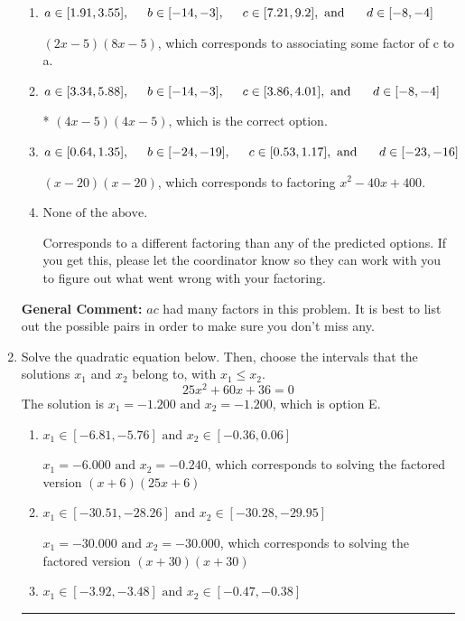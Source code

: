 \documentclass{extbook}[14pt]
\newcommand{\litem}[1]{\item #1

\rule{\textwidth}{0.4pt}}
\begin{document}
\begin{enumerate}
{\begin{enumerate}[label=\Alph*.]
 $(8x -5)(2x -5)$, which corresponds to associating some factor of a to c.
\item \( a \in [1.91, 3.55], \hspace*{5mm} b \in [-14, -3], \hspace*{5mm} c \in [7.21, 9.2], \text{ and } \hspace*{5mm} d \in [-8, -4] \)

 $(2x -5)(8x -5)$, which corresponds to associating some factor of c to a.
\item \( a \in [3.34, 5.88], \hspace*{5mm} b \in [-14, -3], \hspace*{5mm} c \in [3.86, 4.01], \text{ and } \hspace*{5mm} d \in [-8, -4] \)

* $(4x -5)(4x -5)$, which is the correct option.
\item \( a \in [0.64, 1.35], \hspace*{5mm} b \in [-24, -19], \hspace*{5mm} c \in [0.53, 1.17], \text{ and } \hspace*{5mm} d \in [-23, -16] \)

 $(x -20)(x -20)$, which corresponds to factoring $x^{2} -40 x + 400$.
\item \( \text{None of the above.} \)

 Corresponds to a different factoring than any of the predicted options. If you get this, please let the coordinator know so they can work with you to figure out what went wrong with your factoring.
\end{enumerate}

\textbf{General Comment:} $ac$ had many factors in this problem. It is best to list out the possible pairs in order to make sure you don't miss any.
}
\litem{
Solve the quadratic equation below. Then, choose the intervals that the solutions $x_1$ and $x_2$ belong to, with $x_1 \leq x_2$.
\[ 25x^{2} +60 x + 36 = 0 \]The solution is \( x_1 = -1.200 \text{ and } x_2 = -1.200 \), which is option E.\begin{enumerate}[label=\Alph*.]
\item \( x_1 \in [-6.81, -5.76] \text{ and } x_2 \in [-0.36, 0.06] \)

$x_1 = -6.000 \text{ and } x_2 = -0.240$, which corresponds to solving the factored version $(x + 6)(25x + 6)$
\item \( x_1 \in [-30.51, -28.26] \text{ and } x_2 \in [-30.28, -29.95] \)

$x_1 = -30.000 \text{ and } x_2 = -30.000$, which corresponds to solving the factored version $(x + 30)(x + 30)$
\item \( x_1 \in [-3.92, -3.48] \text{ and } x_2 \in [-0.47, -0.38] \)


\end{enumerate}}
\end{enumerate}
\end{document}
